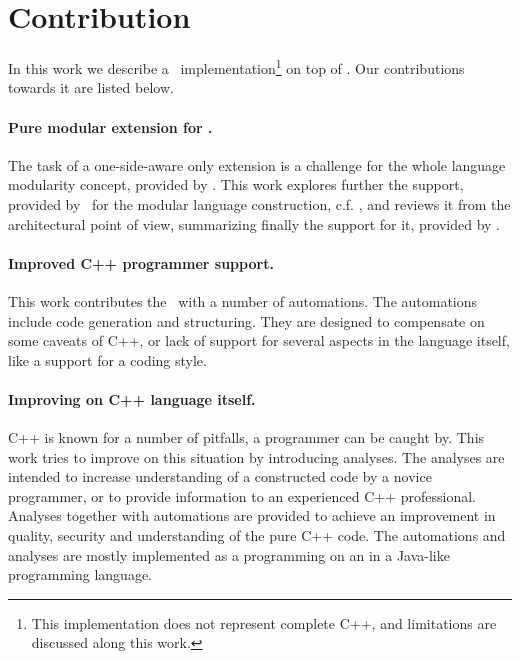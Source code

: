 \section{Contribution}

In this work we describe a \cpppl\ implementation\footnote{This implementation does not represent complete C++, and
limitations are discussed along this work.} on top of \mbdp. Our contributions towards it are listed below.


 \paragraph{Pure modular extension for \mbdr.} The task of a one-side-aware only extension is a challenge for the whole language modularity concept, 
provided by \jbmps. This work explores further the support, provided by \jbmps\ for the modular 
language construction, c.f. \cite{2012_ratiu_modular_dsls_and_analyses}, and reviews it from the architectural point of view,
summarizing finally the support for it, provided by \jbmps.

 \paragraph{Improved C++ programmer support.} This work contributes the \cpppl\ with a number of automations. The automations include code 
generation and structuring. They are designed to compensate on some caveats of C++, or lack of support for 
several aspects in the language itself, like a support for a coding style. 

 \paragraph{Improving on C++ language itself.} C++ is known for a number of pitfalls, 
 a programmer can be caught by. This work tries to improve on this situation by introducing analyses.
The analyses are intended to increase understanding of a constructed code by a novice programmer, 
or to provide information to an experienced C++ professional. Analyses together with automations are provided to 
achieve an improvement in quality, security and understanding of the pure C++ code. The automations and analyses 
are mostly implemented as a programming on an  in a Java-like programming language.

